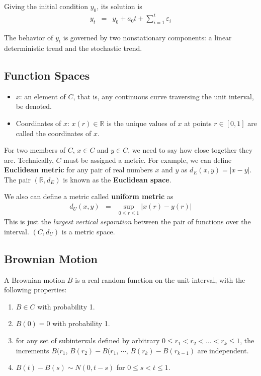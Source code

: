 Giving the initial condition $y_{0}$, its solution is
\begin{eqnarray*}
y_{t}&=&y_{0}+a_{0}t+\sum_{i=1}^{t}\varepsilon_{i}
\end{eqnarray*}

The behavior of $y_{t}$ is governed by two nonstationary components: a linear deterministic trend and the stochastic trend. 

\subsection{Function Spaces}
\begin{itemize}
\item $x$: an element of $C$, that is, any continuous curve traversing the unit interval, be denoted.
\item Coordinates of $x$: $x(r)\in\mathbb{R}$ is the unique values of $x$ at points $r\in[0,1]$ are called the coordinates of $x$.
\end{itemize}

For two members of $C$, $x\in C$ and $y\in C$, we need to say how close together they are. Technically, $C$ must be assigned a metric. For example, we can define \textbf{Euclidean metric} for any pair of real numbers $x$ and $y$ as $d_{E}(x,y)=|x-y|$. The pair $(\mathbb{R},d_{E})$ is known as the \textbf{Euclidean space}. 
 
We also can define a metric called \textbf{uniform metric} as 
\begin{eqnarray*}
d_{U}(x,y)&=&\sup_{0\leq r\leq 1}|x(r)-y(r)|
\end{eqnarray*}
This is just the \textit{largest vertical separation} between the pair of functions over the interval. $(C,d_{U})$ is a metric space. 

\subsection{Brownian Motion}
A Brownian motion $B$ is a real random function on the unit interval, with the following properties:
\begin{enumerate}
\item $B\in C$ with probability 1.
\item $B(0)=0$ with probability 1.
\item for any set of subintervals defined by arbitrary $0\leq r_{1}<r_{2}<\dots<r_{k}\leq 1$, the increments $B(r_{1}$, $B(r_{2})-B(r_{1}$, $\cdots$, $B(r_{k})-B(r_{k-1})$ are independent.
\item $B(t)-B(s)\sim N(0,t-s)$ for $0\leq s<t\leq 1$.
\end{enumerate}


